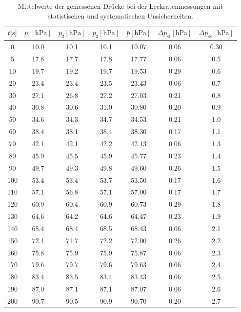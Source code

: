 %
\begin{table}[H]
  \centering
    \caption{Mittelwerte der gemessenen Drücke bei der Leckratenmessungen mit statistischen und systematischen Unsicherheiten.}
    \label{tab:Dreh_Leck2}
    \begin{tabular}{
      S[table-format=3.0] 
      S[table-format=2.1] S[table-format=2.1] S[table-format=2.1]
      S[table-format=2.2] S[table-format=1.2] S[table-format=1.2]
      }
      \toprule
      {$t [\si{\second}$]} &
      {$p_1 [\si{\hecto\pascal}]$} & {$p_2 [\si{\hecto\pascal}]$} & {$p_3 [\si{\hecto\pascal}]$} &
      {$\bar{p} [\si{\hecto\pascal}]$} & {$\Delta p_\text{st} [\si{\hecto\pascal}]$} & {$\Delta p_\text{sy} [\si{\hecto\pascal}]$}\\
          & 10.0 & 10.1 & 10.1 & 10.07 & 0.06 & 0.30\\
      5    & 17.8 & 17.7 & 17.8 & 17.77 & 0.06 & 0.5 \\
      10   & 19.7 & 19.2 & 19.7 & 19.53 & 0.29 & 0.6 \\
      20   & 23.4 & 23.4 & 23.5 & 23.43 & 0.06 & 0.7 \\
      30   & 27.1 & 26.8 & 27.2 & 27.03 & 0.21 & 0.8 \\
      40   & 30.8 & 30.6 & 31.0 & 30.80 & 0.20 & 0.9 \\
      50   & 34.6 & 34.3 & 34.7 & 34.53 & 0.21 & 1.0 \\
      60   & 38.4 & 38.1 & 38.4 & 38.30 & 0.17 & 1.1 \\
      70   & 42.1 & 42.1 & 42.2 & 42.13 & 0.06 & 1.3 \\
      80   & 45.9 & 45.5 & 45.9 & 45.77 & 0.23 & 1.4 \\
      90   & 49.7 & 49.3 & 49.8 & 49.60 & 0.26 & 1.5 \\
      100  & 53.4 & 53.4 & 53.7 & 53.50 & 0.17 & 1.6 \\
      110  & 57.1 & 56.8 & 57.1 & 57.00 & 0.17 & 1.7 \\
      120  & 60.9 & 60.4 & 60.9 & 60.73 & 0.29 & 1.8 \\
      130  & 64.6 & 64.2 & 64.6 & 64.47 & 0.23 & 1.9 \\
      140  & 68.4 & 68.4 & 68.5 & 68.43 & 0.06 & 2.1 \\
      150  & 72.1 & 71.7 & 72.2 & 72.00 & 0.26 & 2.2 \\
      160  & 75.8 & 75.9 & 75.9 & 75.87 & 0.06 & 2.3 \\
      170  & 79.6 & 79.7 & 79.6 & 79.63 & 0.06 & 2.4 \\
      180  & 83.4 & 83.5 & 83.4 & 83.43 & 0.06 & 2.5 \\
      190  & 87.0 & 87.1 & 87.1 & 87.07 & 0.06 & 2.6 \\
      200  & 90.7 & 90.5 & 90.9 & 90.70 & 0.20 & 2.7 \\
      \bottomrule
    \end{tabular}
\end{table}
